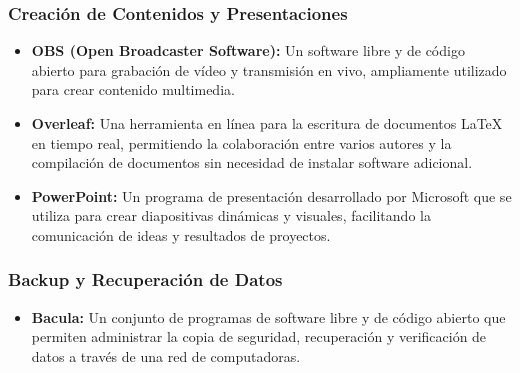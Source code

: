 \subsubsection{Creación de Contenidos y Presentaciones}
\begin{itemize}
    \item \textbf{OBS (Open Broadcaster Software):} Un software libre y de código abierto para grabación de vídeo y transmisión en vivo, ampliamente utilizado para crear contenido multimedia.
    \item \textbf{Overleaf:} Una herramienta en línea para la escritura de documentos LaTeX en tiempo real, permitiendo la colaboración entre varios autores y la compilación de documentos sin necesidad de instalar software adicional.
    \item \textbf{PowerPoint:} Un programa de presentación desarrollado por Microsoft que se utiliza para crear diapositivas dinámicas y visuales, facilitando la comunicación de ideas y resultados de proyectos.
\end{itemize}

\subsubsection{Backup y Recuperación de Datos}
\begin{itemize}
    \item \textbf{Bacula:} Un conjunto de programas de software libre y de código abierto que permiten administrar la copia de seguridad, recuperación y verificación de datos a través de una red de computadoras.
\end{itemize}

